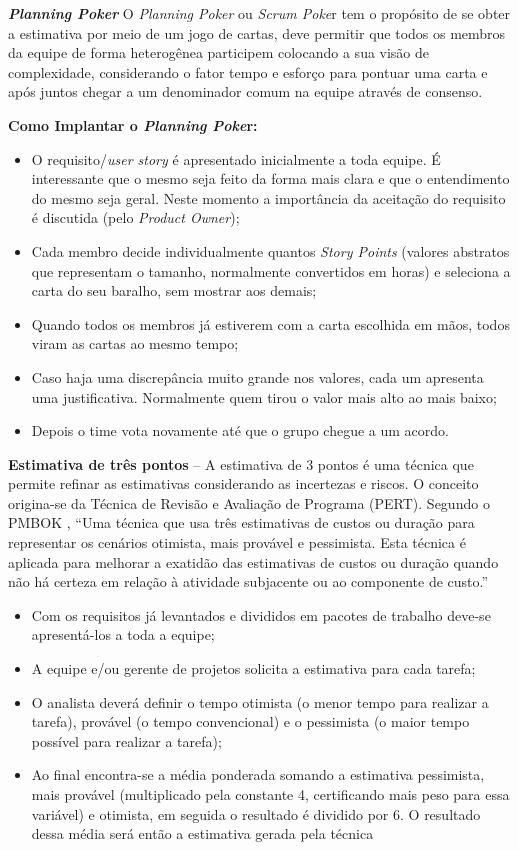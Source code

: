 \textbf{\textit{Planning Poker}}\cite{Cohn2005} O \textit{Planning Poker} ou \textit{Scrum Poke}r tem o propósito de se obter a estimativa por meio de um jogo de cartas, deve permitir que todos os membros da equipe de forma heterogênea participem colocando a sua visão de complexidade, considerando o fator tempo e esforço para pontuar uma carta e após juntos chegar a um denominador comum na equipe através de consenso.

\textbf{Como Implantar o \textit{Planning Poke}r:}
\begin{itemize}
    \item O requisito/\textit{user story} é apresentado inicialmente a toda equipe. É interessante que o mesmo seja feito da forma mais clara e que o entendimento do mesmo seja geral. Neste momento a importância da aceitação do requisito é discutida (pelo \textit{Product Owner});
    \item Cada membro decide individualmente quantos \textit{Story Points} (valores abstratos que representam o tamanho, normalmente convertidos em horas) e seleciona a carta do seu baralho, sem mostrar aos demais;
    \item Quando todos os membros já estiverem com a carta escolhida em mãos, todos viram as cartas ao mesmo tempo;
    \item Caso haja uma discrepância muito grande nos valores, cada um apresenta uma justificativa. Normalmente quem tirou o valor mais alto ao mais baixo;
    \item Depois o time vota novamente até que o grupo chegue a um acordo.
\end{itemize}

\textbf{Estimativa de três pontos} – A estimativa de 3 pontos é uma técnica que permite refinar as estimativas considerando as incertezas e riscos. O conceito origina-se da Técnica de Revisão e Avaliação de Programa (PERT). Segundo o PMBOK \cite{pmbok2014}, “Uma técnica que usa três estimativas de custos ou duração para representar os cenários otimista, mais provável e pessimista. Esta técnica é aplicada para melhorar a exatidão das estimativas de custos ou duração quando não há certeza em relação à atividade subjacente ou ao componente de custo.”

\begin{itemize}
    \item Com os requisitos já levantados e divididos em pacotes de trabalho deve-se apresentá-los a toda a equipe;
    \item A equipe e/ou gerente de projetos solicita a estimativa para cada tarefa;
    \item O analista deverá definir o tempo otimista (o menor tempo para realizar a tarefa), provável (o tempo convencional) e o pessimista (o maior tempo possível para realizar a tarefa);
    \item Ao final encontra-se a média ponderada somando a estimativa pessimista, mais provável (multiplicado pela constante 4, certificando mais peso para essa variável) e otimista, em seguida o resultado é dividido por 6. O resultado dessa média será então a estimativa gerada pela técnica
\end{itemize}

